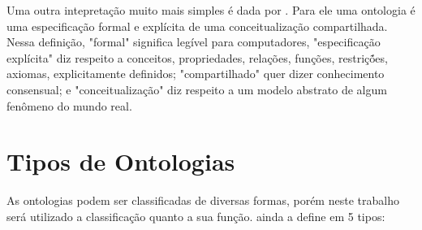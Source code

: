 Uma outra intepretação muito mais simples é dada por
\cite{borst1997construction}. Para ele uma ontologia é uma especificação formal
e explícita de uma conceitualização compartilhada. Nessa definição, "formal"
significa legível para computadores, "especificação explícita" diz respeito a
conceitos, propriedades, relações, funções, restriçṍes, axiomas, explicitamente
definidos; "compartilhado" quer dizer conhecimento consensual; e
"conceitualização" diz respeito a um modelo abstrato de algum fenômeno do mundo
real.

\section{Tipos de Ontologias}
\label{sec:tipos_de_ontologias}

As ontologias podem ser classificadas de diversas formas, porém neste trabalho
será utilizado a classificação quanto a sua função. \cite{guizzardidesenvolvimento}
ainda a define em 5 tipos:

